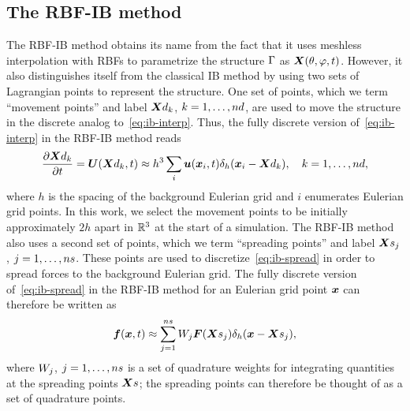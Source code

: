 \subsection{The RBF-IB method}\label{sec:rbfib}

The RBF-IB method obtains its name from the fact that it uses meshless interpolation with RBFs to parametrize the
structure $\Gamma$ as $\boldsymbol{X}(\theta, \varphi, t)$. However, it also distinguishes itself from the classical IB
method by using two sets of Lagrangian points to represent the structure. One set of points, which we term
``movement points'' and label $\data\X_k$, $k=1, \ldots, \data\cardinality$, are used to move the structure in the
discrete analog to~\eqref{eq:ib-interp}. Thus, the fully discrete version of~\eqref{eq:ib-interp} in the RBF-IB
method reads
\begin{equation}\label{eq:ib-interp-disc}
    \frac{\partial\data\X_k}{\partial t} = \U(\data\X_k, t) \approx h^3 \sum_i \u(\x_i, t) \Dirac_h(\x_i-\data\X_k), \quad k=1, \ldots, \data\cardinality,
\end{equation}
where $h$ is the spacing of the background Eulerian grid and $i$ enumerates Eulerian grid points. %
In this work, we select the
movement points to be initially approximately $2h$ apart in $\mathbb{R}^3$ at the start of a simulation. The RBF-IB method
also uses a second set of points, which we term ``spreading points'' and label $\Xsj$,
$j=1, \ldots, \sample\cardinality$. These points are used to discretize~\eqref{eq:ib-spread} in order to spread
forces to the background Eulerian grid. The fully discrete version of~\eqref{eq:ib-spread} in the RBF-IB method
for an Eulerian grid point $\boldsymbol{x}$ can therefore be written as
\begin{align}\label{eq:ib-spread-disc}
        \f(\x, t) \approx\sum\limits_{j=1}^{\sample\cardinality} \weight[j]\F(\Xsj) \Dirac_h(\x-\Xsj),
\end{align}
where $\weight[j]$, $j=1, \ldots, \sample\cardinality$ is a set of quadrature weights for integrating quantities
at the spreading points $\sample\X$; the spreading points can therefore be thought of as a set of quadrature
points.%

